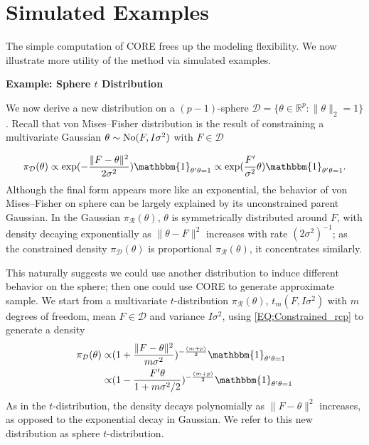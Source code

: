 \documentclass[10pt,fleqn]{article} \pdfoutput=1
\newcommand{\be}{\begin{equation}\begin{aligned}}
\newcommand{\ee}{\end{aligned}\end{equation}}
\newcommand{\bb}[1]{\mathbb{#1}} \newcommand{\mc}[1]{\mathcal{#1}}
\DeclareMathOperator{\1}{\mathbbm{1}} \DeclareMathOperator{\bigO}{\mc O}
\begin{document}
\section{Simulated Examples}

The simple computation of CORE frees up the modeling flexibility. We now illustrate more utility of the method via simulated examples.

\textbf{Example: Sphere $t$ Distribution}

We now derive a new distribution on a $(p-1)$-sphere $\mc
D=\{\theta\in
\bb R^p:\|\theta\|_2 =1\}$. Recall that von
Mises--Fisher distribution \citep{khatri1977mises} is the result of
constraining a multivariate Gaussian $\theta \sim \operatorname{No}(F,I\sigma^2)$ with
$F\in \mc D$ 

$$
\pi_{\mc D}(\theta) \propto
\exp(-\frac{\|F-\theta\|^2}{2\sigma^2})
\mathbbm{1}_{\theta'\theta=1} \\
\propto
\exp(\frac{F'}{\sigma^2}\theta)
\mathbbm{1}_{\theta'\theta=1}.
$$
Although the final form
appears more
like an exponential, the behavior of von
Mises--Fisher
on sphere can be largely explained by its unconstrained parent Gaussian.
In the Gaussian $\pi_{\mc
R}(\theta)$, $\theta$ is symmetrically distributed around $F$, with density
decaying exponentially as $\| \theta-F\|^2$ increases with rate
$({2\sigma^2})^{-1}$; as the constrained
density $\pi_{\mc D}(\theta)$ is proportional $\pi_{\mc R}(\theta)$, it concentrates
similarly.

This naturally suggests we could use another distribution to induce different behavior on the sphere; then one could use CORE to generate approximate sample. We start from a
multivariate $t$-distribution $\pi_{\mc
R}(\theta)$, $t_m(F,I\sigma^2)$ with $m$ degrees of freedom,
mean $F\in \mc D$ and variance $I\sigma^2$, using \eqref{EQ:Constrained_rcp} to generate a density
\be
\pi_{\mc
D}(\theta)
\propto &
(1+\frac{\|F-\theta\|^2}{m\sigma^2})^{-\frac{(m+p)}{2}}\mathbbm{1}_{\theta'\theta=1}\\
\propto &
(1-\frac{F'\theta}{1+m\sigma^2/2})^{-\frac{(m+p)}{2}}\mathbbm{1}_{\theta'\theta=1}
\ee
As in the $t$-distribution, the density decays polynomially as $\|F-\theta\|^2$ increases, as opposed to the exponential decay in Gaussian. We refer to this new distribution as sphere $t$-distribution.
\end{document}

